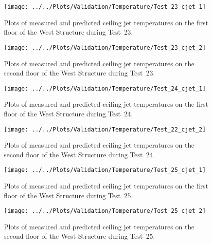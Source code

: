 \begin{figure}[!h]
	\centering
	\texttt{[image: ../../Plots/Validation/Temperature/Test\_23\_cjet\_1]}
	\caption[Plots of measured and predicted ceiling jet temperatures on the first floor during Test~23.]{Plots of measured and predicted ceiling jet temperatures on the first floor of the West Structure during Test~23.}
	\label{fig:cjet1_data_Test23}
\end{figure}

\begin{figure}[!h]
	\centering
	\texttt{[image: ../../Plots/Validation/Temperature/Test\_23\_cjet\_2]}
	\caption[Plots of measured and predicted ceiling jet temperatures on the second floor during Test~23.]{Plots of measured and predicted ceiling jet temperatures on the second floor of the West Structure during Test~23.}
	\label{fig:cjet2_data_Test23}
\end{figure}

\begin{figure}[!h]
	\centering
	\texttt{[image: ../../Plots/Validation/Temperature/Test\_24\_cjet\_1]}
	\caption[Plots of measured and predicted ceiling jet temperatures on the first floor during Test~24.]{Plots of measured and predicted ceiling jet temperatures on the first floor of the West Structure during Test~24.}
	\label{fig:cjet1_data_Test24}
\end{figure}

\begin{figure}[!h]
	\centering
	\texttt{[image: ../../Plots/Validation/Temperature/Test\_22\_cjet\_2]}
	\caption[Plots of measured and predicted ceiling jet temperatures on the second floor during Test~24.]{Plots of measured and predicted ceiling jet temperatures on the second floor of the West Structure during Test~24.}
	\label{fig:cjet2_data_Test24}
\end{figure}

\begin{figure}[!h]
	\centering
	\texttt{[image: ../../Plots/Validation/Temperature/Test\_25\_cjet\_1]}
	\caption[Plots of measured and predicted ceiling jet temperatures on the first floor during Test~25.]{Plots of measured and predicted ceiling jet temperatures on the first floor of the West Structure during Test~25.}
	\label{fig:cjet1_data_Test25}
\end{figure}

\begin{figure}[!h]
	\centering
	\texttt{[image: ../../Plots/Validation/Temperature/Test\_25\_cjet\_2]}
	\caption[Plots of measured and predicted ceiling jet temperatures on the second floor during Test~25.]{Plots of measured and predicted ceiling jet temperatures on the second floor of the West Structure during Test~25.}
	\label{fig:cjet2_data_Test25}
\end{figure}

